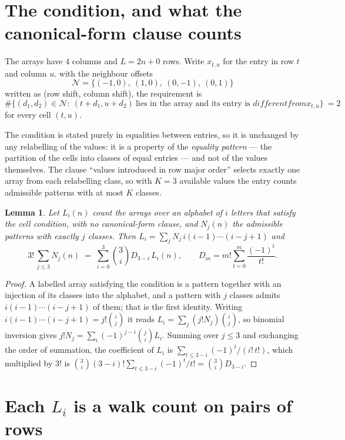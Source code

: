 \documentclass[11pt,a4paper]{article}
\theoremstyle{plain}
\newtheorem{lemma}[theorem]{Lemma}
\theoremstyle{definition}
\begin{document}
\section{The condition, and what the canonical-form clause counts}

The arrays have $4$ columns and $L=2n+0$ rows. Write $x_{t,u}$ for the entry in
row $t$ and column $u$. with the neighbour offsets
\[
\mathcal N=\{(-1,0),\ (1,0),\ (0,-1),\ (0,1)\}
\]
written as (row shift, column shift), the requirement is
\begin{equation}\label{eq:loc}
\#\bigl\{(d_1,d_2)\in\mathcal N:\ (t+d_1,u+d_2)\ \text{lies in the array and its entry is }
different from x_{t,u}\bigr\}\ =2
\end{equation}
for every cell $(t,u)$.

The condition is stated purely in equalities between entries, so it is unchanged by any
relabelling of the values: it is a property of the \emph{equality pattern} --- the partition
of the cells into classes of equal entries --- and not of the values themselves. The clause
``values introduced in row major order'' selects exactly one array from each relabelling
class, so with $K=3$ available values the entry counts admissible patterns with at most $K$
classes.

\begin{lemma}\label{lem:inv}
Let $L_i(n)$ count the arrays over an alphabet of $i$ letters that satisfy the cell
condition, with no canonical-form clause, and $N_j(n)$ the admissible patterns with exactly
$j$ classes. Then $L_i=\sum_j N_j\,i(i-1)\cdots(i-j+1)$ and
\[
3!\,\sum_{j\le 3}N_j(n)\;=\;\sum_{i=0}^{3}\binom{3}{i}D_{3-i}\,L_i(n),
\qquad D_m=m!\sum_{t=0}^{m}\frac{(-1)^t}{t!} .
\]
\end{lemma}

\begin{proof}
A labelled array satisfying the condition is a pattern together with an injection of its
classes into the alphabet, and a pattern with $j$ classes admits $i(i-1)\cdots(i-j+1)$ of
them; that is the first identity. Writing $i(i-1)\cdots(i-j+1)=j!\binom{i}{j}$ it reads
$L_i=\sum_j(j!N_j)\binom{i}{j}$, so binomial inversion gives
$j!N_j=\sum_i(-1)^{j-i}\binom{j}{i}L_i$. Summing over $j\le3$ and exchanging the
order of summation, the coefficient of $L_i$ is
$\sum_{t\le3-i}(-1)^t/(i!\,t!)$, which multiplied by $3!$ is
$\binom{3}{i}(3-i)!\sum_{t\le3-i}(-1)^t/t!=\binom{3}{i}D_{3-i}$.
\end{proof}

\section{Each $L_i$ is a walk count on pairs of rows}
\end{document}

